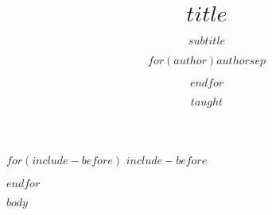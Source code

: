 \documentclass{article}
\title{$title$}
\subtitle{$subtitle$}
\author{$for(author)$$author$$sep$ \and $endfor$}
\date{$taught$}
\begin{document}
$for(include-before)$
$include-before$

$endfor$

$body$
\end{document}
